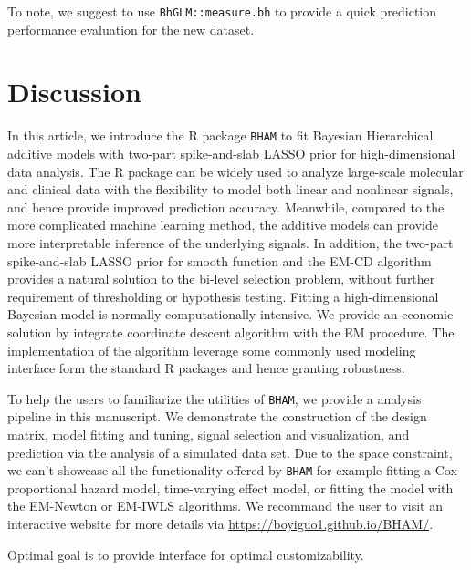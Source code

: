 \documentclass[
]{jss}
\begin{document}
To note, we suggest to use \texttt{BhGLM::measure.bh} to provide a quick
prediction performance evaluation for the new dataset.

\begin{CodeChunk}
\end{CodeChunk}

\section{Discussion}

In this article, we introduce the R package \texttt{BHAM} to fit
Bayesian Hierarchical additive models with two-part spike-and-slab LASSO
prior for high-dimensional data analysis. The R package can be widely
used to analyze large-scale molecular and clinical data with the
flexibility to model both linear and nonlinear signals, and hence
provide improved prediction accuracy. Meanwhile, compared to the more
complicated machine learning method, the additive models can provide
more interpretable inference of the underlying signals. In addition, the
two-part spike-and-slab LASSO prior for smooth function and the EM-CD
algorithm provides a natural solution to the bi-level selection problem,
without further requirement of thresholding or hypothesis testing.
Fitting a high-dimensional Bayesian model is normally computationally
intensive. We provide an economic solution by integrate coordinate
descent algorithm with the EM procedure. The implementation of the
algorithm leverage some commonly used modeling interface form the
standard R packages and hence granting robustness.

To help the users to familiarize the utilities of \texttt{BHAM}, we
provide a analysis pipeline in this manuscript. We demonstrate the
construction of the design matrix, model fitting and tuning, signal
selection and visualization, and prediction via the analysis of a
simulated data set. Due to the space constraint, we can't showcase all
the functionality offered by \texttt{BHAM} for example fitting a Cox
proportional hazard model, time-varying effect model, or fitting the
model with the EM-Newton or EM-IWLS algorithms. We recommand the user to
visit an interactive website for more details via
\url{https://boyiguo1.github.io/BHAM/}.

Optimal goal is to provide interface for optimal customizability.

\clearpage


\end{document}
